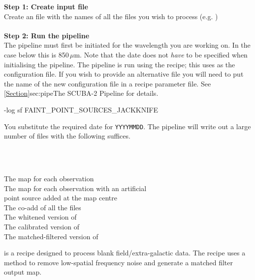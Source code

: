 \documentclass[11pt,oneside,chapters]{starlink}
\begin{document}
\textbf{Step 1: Create input file}\\
Create an file with the names of all the files you wish to process (e.g.
)
\\ \\
\textbf{Step 2: Run the pipeline}\\
The pipeline must first be initiated for the wavelength you are
working on. In the case below this is 850\,$\mu$m. Note that the date
does not \emph{have} to be specified when initialising the pipeline.
The pipeline is run using the
recipe; this uses  as the
configuration file. If you wish to provide an alternative file you
will need to put the name of the new configuration file in a recipe
parameter file.  See \cref{Section}{sec:pipe}{The SCUBA-2 Pipeline}
for details.
\begin{terminalv}
-log sf FAINT_POINT_SOURCES_JACKKNIFE
\end{terminalv}

You substitute the required date for \texttt{YYYYMMDD}.
The pipeline will write out a large number of files with the following
suffices.

\begin{minipage}[t]{0.3\linewidth}
\\\\
\end{minipage}
\begin{minipage}[t]{0.7\linewidth}
The map for each observation\\
The map for each observation with an artificial\\point source added at the map centre\\
The co-add of all the  files\\
The whitened version of \\
The calibrated version of \\
The matched-filtered version of \\
\end{minipage}

 is a recipe designed to
process blank field/extra-galactic data. The recipe uses a
method to remove low-spatial frequency noise and generate a matched
filter output map.
\end{document}

